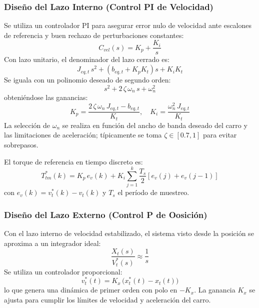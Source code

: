 \documentclass[11pt]{article}                                    %
\begin{document}
\subsubsection{Diseño del Lazo Interno (Control PI de Velocidad)}
Se utiliza un controlador PI para asegurar error nulo de velocidad ante escalones de referencia y buen rechazo de perturbaciones constantes:
\begin{equation}
    C_{vel}(s) = K_p + \frac{K_i}{s}
\end{equation}
Con lazo unitario, el denominador del lazo cerrado es:
\begin{equation}
    J_{eq,t}\,s^2 + \left(b_{eq,t} + K_p K_t\right)s + K_i K_t
\end{equation}
Se iguala con un polinomio deseado de segundo orden:
\begin{equation}
    s^2 + 2\,\zeta\,\omega_n\,s + \omega_n^2
\end{equation}
obteniéndose las ganancias:
\begin{equation}
    K_p = \frac{2\,\zeta\,\omega_n\,J_{eq,t} - b_{eq,t}}{K_t}, \quad
    K_i = \frac{\omega_n^2\,J_{eq,t}}{K_t}
\end{equation}
La selección de $\omega_n$ se realiza en función del ancho de banda deseado del carro y las limitaciones de aceleración; típicamente se toma $\zeta \in [0.7,1]$ para evitar sobrepasos.

El torque de referencia en tiempo discreto es:
\begin{equation}
    T_{tm}^\ast(k) = K_p\,e_v(k) + K_i \sum_{j=1}^{k} \frac{T_s}{2}\left[e_v(j) + e_v(j-1)\right]
\end{equation}
con $e_v(k) = v_t^\ast(k) - v_t(k)$ y $T_s$ el período de muestreo.

\subsubsection{Diseño del Lazo Externo (Control P de Oosición)}
Con el lazo interno de velocidad estabilizado, el sistema visto desde la posición se aproxima a un integrador ideal:
\begin{equation}
    \frac{X_t(s)}{V_t^\ast(s)} \approx \frac{1}{s}
\end{equation}
Se utiliza un controlador proporcional:
\begin{equation}
    v_t^\ast(t) = K_x \,\bigl(x_t^\ast(t) - x_t(t)\bigr)
\end{equation}
lo que genera una dinámica de primer orden con polo en $-K_x$. La ganancia $K_x$ se ajusta para cumplir los límites de velocidad y aceleración del carro.
\end{document}
